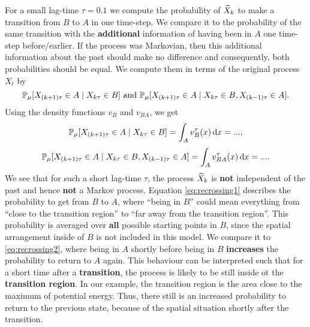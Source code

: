 For a small lag-time $\tau = 0.1$ we compute the probability of $\widetilde{X}_k$ to make a transition from $B$ to $A$ in one time-step. We compare it to the probability of the same transition with the \textbf{additional} information of having been in $A$ one time-step before/earlier. If the process was Markovian, then this additional information about the past should make no difference and consequently, both probabilities should be equal.
We compute them in terms of the original process $X_t$ by
\begin{equation*}
\mathbb{P}_\mu[X_{(k+1)\tau} \in A \mid X_{k\tau} \in B] \textrm{ and }
\mathbb{P}_\mu[X_{(k+1)\tau} \in A \mid X_{k\tau} \in B, X_{(k-1)\tau} \in A].
\end{equation*}
Using the density functions $v_B$ and $v_{BA}$, we get %
\begin{equation}
\label{eq:recrossing1}
\mathbb{P}_\mu[X_{(k+1)\tau} \in A \mid X_{k\tau} \in B] = \int_A v_B^\tau(x) \mathop{}\!\mathrm{d} x = ... ,
\end{equation}
\begin{equation}
\label{eq:recrossing2}
\mathbb{P}_\mu[X_{(k+1)\tau} \in A \mid X_{k\tau} \in B, X_{(k-1)\tau} \in A] = \int_A v_{BA}^\tau(x) \mathop{}\!\mathrm{d} x = ... .
\end{equation}
We see that for such a short lag-time $\tau$, the process $\widetilde{X}_k$ is \textbf{not} independent of the past  and hence \textbf{not} a Markov process.
Equation \eqref{eq:recrossing1} describes the probability to get from $B$ to $A$, where ``being in $B$'' could mean everything from ``close to the transition region'' to ``far away from the transition region''. This probability is averaged over \textbf{all} possible starting points in $B$, since the spatial arrangement inside of $B$ is not included in this model.  %
We compare it to \eqref{eq:recrossing2}, where being in $A$ shortly before
being in $B$ \textbf{increases} the probability to return to $A$ again. %
This behaviour can be interpreted such that for a short time after a \textbf{transition}, the process is likely to be still inside ot the \textbf{transition region}.
In our example, the transition region is the area close to the maximum of potential energy. Thus, there still is an increased probability to return to the previous state,
because of the spatial situation shortly after the transition. %
\\

